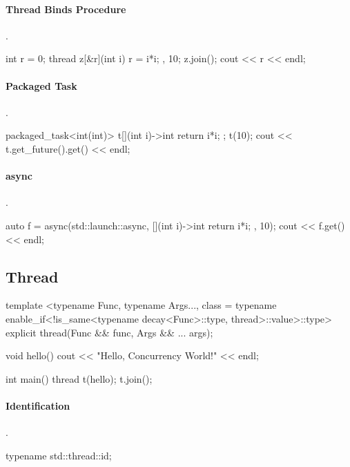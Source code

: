 \paragraph{Thread Binds Procedure}{.}
\begin{code}
int r = 0;
thread z{[&r](int i){ r = i*i; }, 10};
z.join();
cout << r << endl;
\end{code}

\paragraph{Packaged Task}{.}
\begin{code}
packaged_task<int(int)> t{[](int i)->int{ return i*i; }};
t(10);
cout << t.get_future().get() << endl;
\end{code}

\paragraph{async}{.}
\begin{code}
auto f = async(std::launch::async, [](int i)->int{ return i*i; }, 10);
cout << f.get() << endl;
\end{code}

\subsection*{Thread}

\begin{nametablel}
\end{nametablel}

\begin{code}
template <typename Func, typename Args..., class = typename
enable_if<!is_same<typename decay<Func>::type, thread>::value>::type>
explicit thread(Func && func, Args && ... args);

void hello()
{
  cout << "Hello, Concurrency World!" << endl;
}

int main()
{
  thread t(hello);
  t.join();
}
\end{code}

\paragraph{Identification}{.}
\begin{code}
typename std::thread::id;
\end{code}

